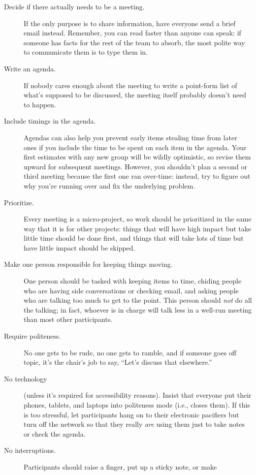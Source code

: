 \begin{description}
\item[Decide if there actually needs to be a meeting.]
If the only purpose is to share information, have everyone send a
brief email instead. Remember, you can read faster than anyone can
speak: if someone has facts for the rest of the team to absorb, the
most polite way to communicate them is to type them in.
\item[Write an agenda.]
If nobody cares enough about the meeting to write a point-form list
of what's supposed to be discussed, the meeting itself probably
doesn't need to happen.
\item[Include timings in the agenda.]
Agendas can also help you prevent early items stealing time from
later ones if you include the time to be spent on each item in the
agenda. Your first estimates with any new group will be wildly
optimistic, so revise them upward for subsequent meetings. However,
you shouldn't plan a second or third meeting because the first one
ran over-time: instead, try to figure out why you're running over
and fix the underlying problem.
\item[Prioritize.]
Every meeting is a micro-project, so work should be prioritized in
the same way that it is for other projects: things that will have
high impact but take little time should be done first, and things
that will take lots of time but have little impact should be
skipped.
\item[Make one person responsible for keeping things moving.]
One person should be tasked with keeping items to time, chiding
people who are having side conversations or checking email, and
asking people who are talking too much to get to the point. This
person should \emph{not} do all the talking; in fact, whoever is in
charge will talk less in a well-run meeting than most other
participants.
\item[Require politeness.]
No one gets to be rude, no one gets to ramble, and if someone goes
off topic, it's the chair's job to say, ``Let's discuss that
elsewhere.''
\item[No technology]
(unless it's required for accessibility reasons). Insist that
everyone put their phones, tablets, and laptops into politeness mode
(i.e., closes them). If this is too stressful, let participants hang
on to their electronic pacifiers but turn off the network so that
they really \emph{are} using them just to take notes or check the agenda.
\item[No interruptions.]
Participants should raise a finger, put up a sticky note, or make

\end{description}
